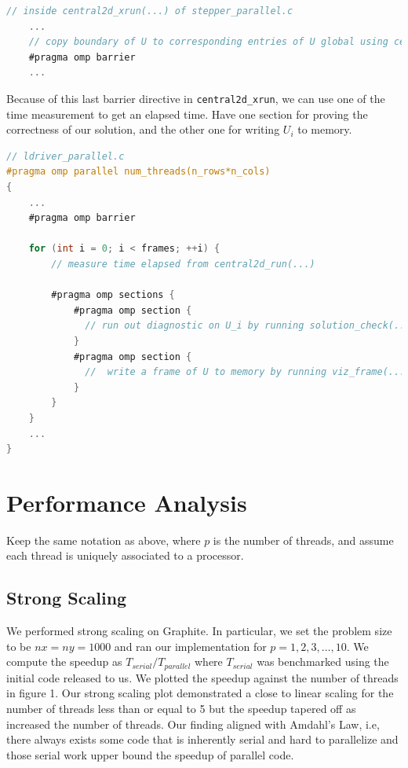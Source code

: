 \documentclass{article}
\begin{document}
\begin{lstlisting}[language=C]
// inside central2d_xrun(...) of stepper_parallel.c
    ...
    // copy boundary of U to corresponding entries of U global using central2d_local_to_global(...)
    #pragma omp barrier
    ...
\end{lstlisting}

Because of this last barrier directive in \texttt{central2d\_xrun}, we can use one of the time measurement to get an elapsed time. Have one section for proving the correctness of our solution, and the other one for writing $U_i$ to memory.

\begin{lstlisting}[language=C]
// ldriver_parallel.c
#pragma omp parallel num_threads(n_rows*n_cols)
{
    ...
    #pragma omp barrier
    
    for (int i = 0; i < frames; ++i) {
        // measure time elapsed from central2d_run(...)
        
        #pragma omp sections {
            #pragma omp section {
              // run out diagnostic on U_i by running solution_check(...)
            }
            #pragma omp section {
              //  write a frame of U to memory by running viz_frame(...);
            }
        }
    }
    ...
}
\end{lstlisting}

\section{Performance Analysis}

Keep the same notation as above, where $p$ is the number of threads, and assume each thread is uniquely associated to a processor.

\subsection{Strong Scaling}

We performed strong scaling on Graphite. In particular, we set the problem size to be $nx = ny = 1000$ and ran our implementation for $p = 1, 2, 3, \ldots, 10$. We compute the speedup as $T_{serial} / T_{parallel}$ where $T_{serial}$ was benchmarked using the initial code released to us. We plotted the speedup against the number of threads in figure 1. Our strong scaling plot demonstrated a close to linear scaling for the number of threads less than or equal to 5 but the speedup tapered off as increased the number of threads. Our finding aligned with Amdahl’s Law, i.e, there always exists some code that is inherently serial and hard to parallelize and those serial work upper bound the speedup of parallel code.
\end{document}
